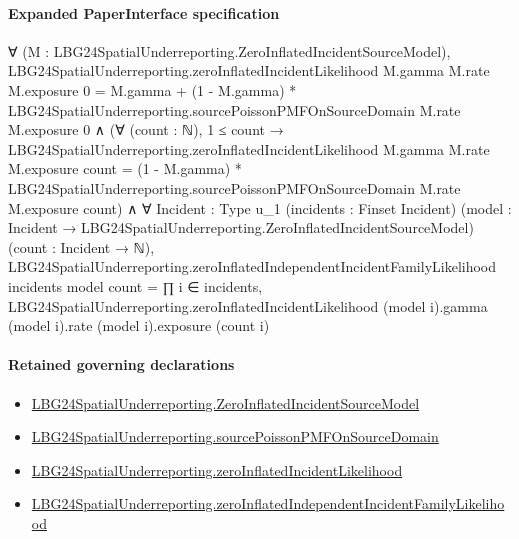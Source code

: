 \documentclass[10pt]{article}
\begin{document}
\paragraph{Expanded PaperInterface specification}
\begin{ReviewVerbatim}
∀ (M : LBG24SpatialUnderreporting.ZeroInflatedIncidentSourceModel),
  LBG24SpatialUnderreporting.zeroInflatedIncidentLikelihood M.gamma M.rate M.exposure 0 =
      M.gamma + (1 - M.gamma) * LBG24SpatialUnderreporting.sourcePoissonPMFOnSourceDomain M.rate M.exposure 0 ∧
    (∀ (count : ℕ),
        1 ≤ count →
          LBG24SpatialUnderreporting.zeroInflatedIncidentLikelihood M.gamma M.rate M.exposure count =
            (1 - M.gamma) * LBG24SpatialUnderreporting.sourcePoissonPMFOnSourceDomain M.rate M.exposure count) ∧
      ∀ {Incident : Type u_1} (incidents : Finset Incident)
        (model : Incident → LBG24SpatialUnderreporting.ZeroInflatedIncidentSourceModel) (count : Incident → ℕ),
        LBG24SpatialUnderreporting.zeroInflatedIndependentIncidentFamilyLikelihood incidents model count =
          ∏ i ∈ incidents,
            LBG24SpatialUnderreporting.zeroInflatedIncidentLikelihood (model i).gamma (model i).rate (model i).exposure
              (count i)
\end{ReviewVerbatim}

\paragraph{Retained governing declarations}
\begin{itemize}\raggedright
\item \hyperlink{governing-declaration-a3d1dc2c498506a2}{LBG24\allowbreak{}Spatial\allowbreak{}Underreporting.\allowbreak{}Zero\allowbreak{}Inflated\allowbreak{}Incident\allowbreak{}Source\allowbreak{}Model}
\item \hyperlink{governing-declaration-9a24d22062827cef}{LBG24\allowbreak{}Spatial\allowbreak{}Underreporting.\allowbreak{}source\allowbreak{}Poisson\allowbreak{}PMF\allowbreak{}On\allowbreak{}Source\allowbreak{}Domain}
\item \hyperlink{governing-declaration-4ea59061d384b2f6}{LBG24\allowbreak{}Spatial\allowbreak{}Underreporting.\allowbreak{}zero\allowbreak{}Inflated\allowbreak{}Incident\allowbreak{}Likelihood}
\item \hyperlink{paper-prerequisite-a737593e189d73f6}{LBG24\allowbreak{}Spatial\allowbreak{}Underreporting.\allowbreak{}zero\allowbreak{}Inflated\allowbreak{}Independent\allowbreak{}Incident\allowbreak{}Family\allowbreak{}Likelihood}
\end{itemize}
\end{document}
